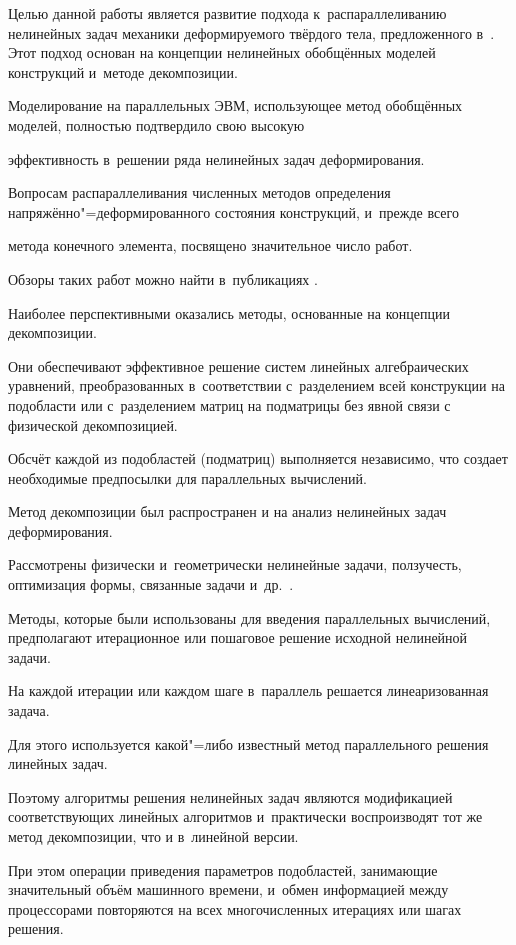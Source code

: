 Целью данной работы является развитие подхода к~распараллеливанию нелинейных задач механики деформируемого твёрдого тела, предложенного в~\cite{kleb11:bib1, kleb11:bib2}. Этот подход основан на концепции нелинейных обобщённых моделей конструкций и~методе декомпозиции.

Моделирование на параллельных ЭВМ, использующее метод обобщённых моделей, полностью подтвердило свою высокую

эффективность в~решении ряда нелинейных задач деформирования.



Вопросам распараллеливания численных методов определения напряжённо"=деформированного состояния конструкций, и~прежде всего

метода конечного элемента, посвящено значительное число работ. 

Обзоры таких работ можно найти в~публикациях \cite{kleb11:bib3, kleb11:bib4}.

Наиболее перспективными оказались методы, основанные на концепции декомпозиции. 

Они обеспечивают эффективное решение систем линейных алгебраических уравнений, преобразованных в~соответствии с~разделением всей конструкции на подобласти или с~разделением матриц на подматрицы без явной связи с физической декомпозицией. 

Обсчёт каждой из подобластей (подматриц) выполняется независимо, что создает необходимые предпосылки для параллельных вычислений.



Метод декомпозиции был распространен и на анализ нелинейных задач деформирования. 

Рассмотрены физически и~геометрически нелинейные задачи, ползучесть, оптимизация формы, связанные задачи и~др.~\cite{kleb11:bib4}. 

Методы, которые были использованы для введения параллельных вычислений, предполагают итерационное или пошаговое решение исходной нелинейной задачи. 

На каждой итерации или каждом шаге в~параллель решается линеаризованная задача. 

Для этого используется какой"=либо известный метод параллельного решения линейных задач. 

Поэтому алгоритмы решения нелинейных задач являются модификацией соответствующих линейных алгоритмов и~практически воспроизводят тот же метод декомпозиции, что и в~линейной версии. 

При этом операции приведения параметров подобластей, занимающие значительный объём машинного времени, и~обмен информацией между процессорами повторяются на всех многочисленных итерациях или шагах решения. 

